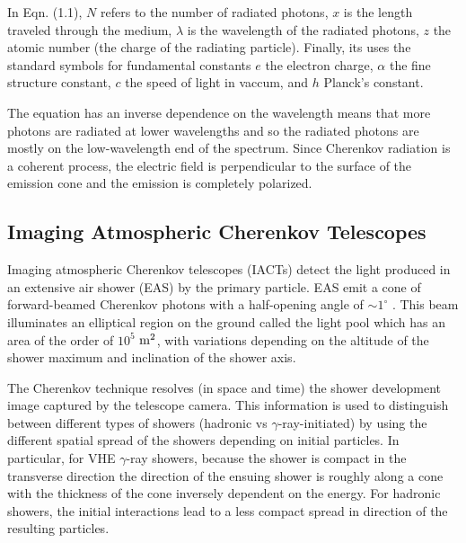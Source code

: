 \documentclass[main.tex]{subfiles}
\begin{document}
In Eqn. (1.1), $N$ refers to the number of radiated photons, $x$ is the length traveled through the medium, $\lambda$ is the wavelength of the radiated photons, $z$ the atomic number (the charge of the radiating particle). Finally, its uses the standard symbols for fundamental constants $e$ the electron charge, $\alpha$ the fine structure constant, $c$ the speed of light in vaccum, and $h$ Planck's constant.

The equation has an inverse dependence on the wavelength means that more photons are radiated at lower wavelengths and so the radiated photons are mostly on the low-wavelength end of the spectrum. Since Cherenkov radiation is a coherent process, the electric field is perpendicular to the surface of the emission cone and the emission is completely polarized.

\subsection{Imaging Atmospheric Cherenkov Telescopes}
Imaging atmospheric Cherenkov telescopes (IACTs) detect the light produced in an extensive air shower (EAS) by the primary particle. EAS emit a cone of forward-beamed Cherenkov photons with a half-opening angle of $\sim 1^\circ$ \cite{antonelli2009}. This beam illuminates an elliptical region on the ground called the light pool which has an area of the order of $10^5$ $\textrm{m}^2$, with variations depending on the altitude of the shower maximum and inclination of the shower axis. \par
The Cherenkov technique resolves (in space and time) the shower development image captured by the telescope camera. This information is used to distinguish between different types of showers (hadronic vs $\gamma$-ray-initiated) by using the different spatial spread of the showers depending on initial particles. In particular, for VHE $\gamma$-ray showers, because the shower is compact in the transverse direction the direction of the ensuing shower is roughly along a cone with the thickness of the cone inversely dependent on the energy. %
 For hadronic showers, the initial interactions lead to a less compact spread in direction of the resulting particles.\par
\end{document}
